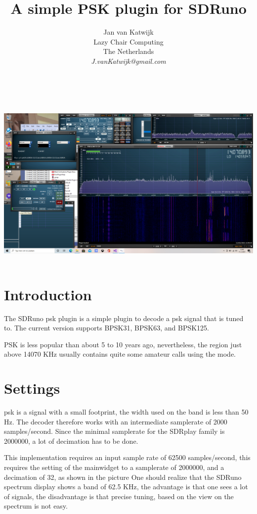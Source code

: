 \documentclass[11pt]{article}
\begin{document}
\title{A simple PSK plugin for SDRuno}
\author{
Jan van Katwijk\\
Lazy Chair Computing \\
The Netherlands\\
{\em J.vanKatwijk@gmail.com}}
\maketitle
\ \\
\ \\
\includegraphics[width=140mm]{psk-example.png}
\ \\
\section{Introduction}
The SDRuno psk plugin is a simple plugin to decode a psk signal that
is tuned to. The current version supports BPSK31, BPSK63, and BPSK125.

PSK is less popular than about 5 to 10 years ago, nevertheless, the region
just above 14070 KHz usually contains quite some amateur calls using the
mode.

\section{Settings}
psk is a signal with a small footprint, the width used on  the band is
less than 50 Hz. The decoder therefore works with an intermediate
samplerate of 2000 samples/second. Since the minimal samplerate for the
SDRplay family is 2000000, a lot of decimation has to be done.
\par
This implementation requires an input sample rate of 62500 samples/second,
this requires the setting of the mainwidget to a samplerate of 2000000,
and a decimation of 32, as shown in the picture
One should realize that the SDRuno spectrum display shows a band of 62.5
KHz, the advantage is that one sees a lot of signals, the disadvantage
is that precise tuning, based on the view on the spectrum is not easy.
\end{document}
